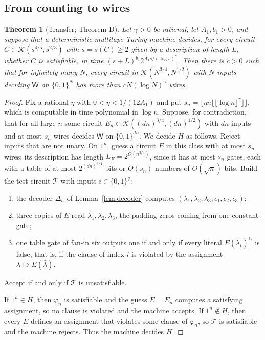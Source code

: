 \documentclass[11pt,reqno]{amsart}
\numberwithin{equation}{section}
\theoremstyle{plain}
\newtheorem{theorem}{Theorem}[section]
\theoremstyle{definition}
\theoremstyle{remark}
\newcommand{\cK}{\mathcal{K}}
\newcommand{\Wl}{\mathsf{W}}
\begin{document}
\subsection{From counting to wires}
\begin{theorem}[Transfer; Theorem D]\label{thm:transfer}
Let $\gamma>0$ be rational, let $A_1,b_1>0$, and suppose that a deterministic multitape Turing
machine decides, for every circuit $C\in\cK(s^{4/5},s^{2/3})$ with $s=s(C)\ge2$
given by a description of length $L$, whether $C$ is satisfiable, in time
$(s+L)^{b_1}2^{A_1s/(\log s)^\gamma}$. Then there is $c>0$ such that for infinitely
many $N$, every circuit in $\cK(N^{3/4},N^{1/2})$ with $N$ inputs deciding $\Wl$ on
$\{0,1\}^N$ has more than $cN(\log N)^\gamma$ wires.
\end{theorem}

\begin{proof}
Fix a rational $\eta$ with $0<\eta<1/(12A_1)$ and put
$s_n=\lfloor\eta n\lfloor\lfloor\log n\rfloor^\gamma\rfloor\rfloor$, which is
computable in time polynomial in $\log n$. Suppose,
for contradiction, that for all large $n$ some circuit $E_n\in\cK((dn)^{3/4},
(dn)^{1/2})$ with $dn$ inputs and at most $s_n$ wires decides $\Wl$ on
$\{0,1\}^{dn}$. We decide $H$ as follows. Reject inputs that are not unary. On
$1^n$, guess a circuit $E$ in this class with at most $s_n$ wires; its
description has length $L_E=2^{O(n^{3/4})}$, since it has at most $s_n$ gates,
each with a table of at most $2^{(dn)^{3/4}}$ bits or $O(s_n)$ numbers of
$O(\sqrt n)$ bits. Build the test circuit $\mathcal T$ with inputs
$i\in\{0,1\}^q$:
\begin{enumerate}[label=\textup{(\arabic*)},leftmargin=2em]
\item the decoder $\Delta_n$ of Lemma~\ref{lem:decoder} computes
$(\lambda_1,\lambda_2,\lambda_3,\epsilon_1,\epsilon_2,\epsilon_3)$;
\item three copies of $E$ read $\bar\lambda_1,\bar\lambda_2,\bar\lambda_3$, the
padding zeros coming from one constant gate;
\item one table gate of fan-in six outputs one if and only if every literal
$E(\bar\lambda_t)^{\epsilon_t}$ is false, that is, if the clause of index $i$ is
violated by the assignment $\lambda\mapsto E(\bar\lambda)$.
\end{enumerate}
Accept if and only if $\mathcal T$ is unsatisfiable.

If $1^n\in H$, then $\varphi_n$ is satisfiable and the guess $E=E_n$ computes a
satisfying assignment, so no clause is violated and the machine accepts. If
$1^n\notin H$, then every $E$ defines an assignment that violates some clause of
$\varphi_n$, so $\mathcal T$ is satisfiable and the machine rejects. Thus the
machine decides $H$.


\end{proof}
\end{document}

